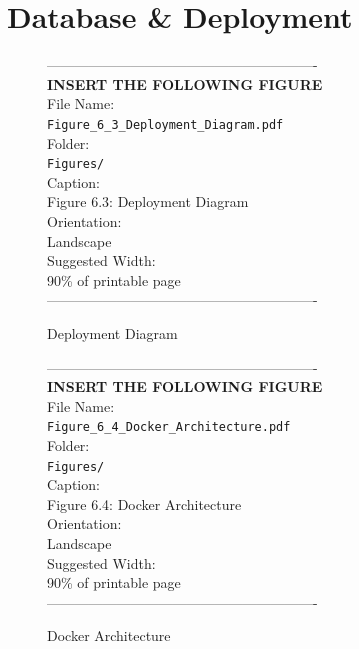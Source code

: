\section{Database \& Deployment}
\vspace{1em}
\begin{figure}[htbp]
\begin{center}
----------------------------------------------------------\\
\vspace{0.5em}
\textbf{INSERT THE FOLLOWING FIGURE}\\
\vspace{1em}
File Name:\\
\texttt{Figure\_6\_3\_Deployment\_Diagram.pdf}\\
\vspace{1em}
Folder:\\
\texttt{Figures/}\\
\vspace{1em}
Caption:\\
Figure 6.3: Deployment Diagram\\
\vspace{1em}
Orientation:\\
Landscape\\
\vspace{1em}
Suggested Width:\\
90\% of printable page\\
\vspace{3cm}
----------------------------------------------------------
\end{center}
\caption{Deployment Diagram}
\label{fig:diag_11}
\end{figure}
\vspace{1em}
\begin{figure}[htbp]
\begin{center}
----------------------------------------------------------\\
\vspace{0.5em}
\textbf{INSERT THE FOLLOWING FIGURE}\\
\vspace{1em}
File Name:\\
\texttt{Figure\_6\_4\_Docker\_Architecture.pdf}\\
\vspace{1em}
Folder:\\
\texttt{Figures/}\\
\vspace{1em}
Caption:\\
Figure 6.4: Docker Architecture\\
\vspace{1em}
Orientation:\\
Landscape\\
\vspace{1em}
Suggested Width:\\
90\% of printable page\\
\vspace{3cm}
----------------------------------------------------------
\end{center}
\caption{Docker Architecture}
\label{fig:diag_12}
\end{figure}
